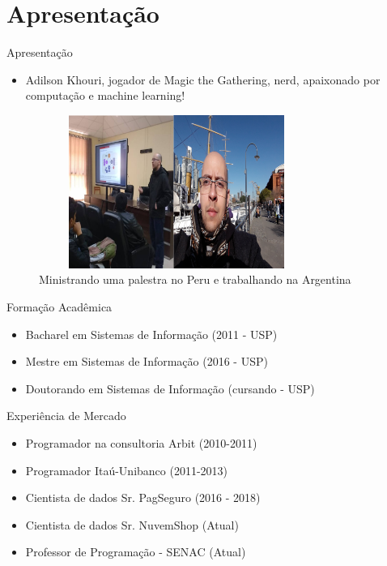 \section{Apresentação}

\begin{frame}	
	\begin{block}{Apresentação}	
		\begin{itemize}
			\item Adilson Khouri,  jogador de Magic the Gathering, nerd, apaixonado por computação e machine learning!
		\end{itemize}
		 \begin{figure}[!htb]
			\centering	  				
			\includegraphics[height=5cm, width = 9cm]{./pic/image3460.png}
			\caption{Ministrando uma palestra no Peru e trabalhando na Argentina}
			\label{fig_adilson_argentina}
		\end{figure}
	\end{block}
\end{frame}
			
\begin{frame}	
	\begin{block}{Formação Acadêmica}
		 \begin{itemize}
			  \item Bacharel em Sistemas de Informação (2011 - USP)
			  \item Mestre em Sistemas de Informação (2016 - USP)
			  \item Doutorando em Sistemas de Informação (cursando - USP)
		  \end{itemize}
	\end{block}
\end{frame}

\begin{frame}	
	\begin{block}{Experiência de Mercado}
		\begin{itemize}
			\item Programador na consultoria Arbit (2010-2011)
			\item Programador Itaú-Unibanco (2011-2013)
			\item Cientista de dados Sr. PagSeguro (2016 - 2018)
			\item Cientista de dados Sr. NuvemShop (Atual)
			\item Professor de Programação - SENAC (Atual)
		\end{itemize}
	\end{block}
\end{frame}
